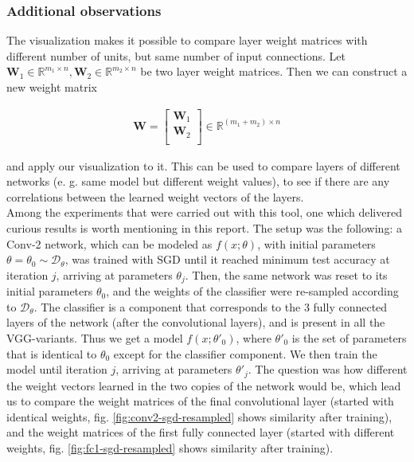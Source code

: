 \subsubsection*{Additional observations}
The visualization makes it possible to compare layer weight matrices with different number of units, but same number of input connections. Let $\mathbf{W}_1 \in \mathbb{R}^{m_1 \times n}, \mathbf{W}_2 \in \mathbb{R}^{m_2 \times n}$ be two layer weight matrices. Then we can construct a new weight matrix 

\begin{align*}
\mathbf{W} = \left[ \begin{array}{r}
\mathbf{W}_1 \\
\mathbf{W}_2 \\
\end{array}\right] \in \mathbb{R}^{(m_1+m_2) \times n}
\end{align*}

and apply our visualization to it. This can be used to compare layers of different networks (e. g. same model but different weight values), to see if there are any correlations between the learned weight vectors of the layers. \\

Among the experiments that were carried out with this tool, one which delivered curious results is worth mentioning in this report. The setup was the following: a Conv-2 network, which can be modeled as $f(x; \theta)$, with initial parameters $\theta = \theta_0 \sim \mathcal{D}_{\theta}$, was trained with SGD until it reached minimum test accuracy at iteration $j$, arriving at parameters $\theta_j$. Then, the same network was reset to its initial parameters $\theta_0$, and the weights of the classifier were re-sampled according to $\mathcal{D}_{\theta}$. The classifier is a component that corresponds to the 3 fully connected layers of the network (after the convolutional layers), and is present in all the VGG-variants. Thus we get a model $f(x; \theta'_0)$, where $\theta'_0$ is the set of parameters that is identical to $\theta_0$ except for the classifier component. We then train the model until iteration $j$, arriving at parameters $\theta'_j$. The question was how different the weight vectors learned in the two copies of the network would be, which lead us to compare the weight matrices of the final convolutional layer (started with identical weights, fig. \ref{fig:conv2-sgd-resampled} shows similarity after training), and the weight matrices of the first fully connected layer (started with different weights, fig. \ref{fig:fc1-sgd-resampled} shows similarity after training). \\

